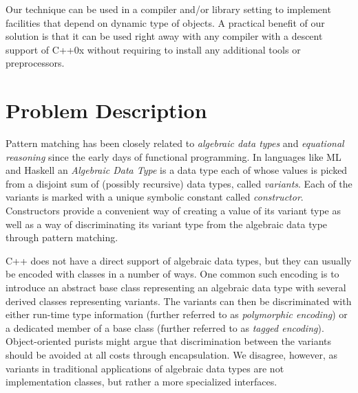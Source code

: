\documentclass[preprint]{sigplanconf}
\begin{document}
\noindent
Our technique can be used in a compiler and/or library setting to implement 
facilities that depend on dynamic type of objects. A practical benefit of our 
solution is that it can be used right away with any compiler with a descent 
support of C++0x without requiring to install any additional tools or 
preprocessors.

\section{Problem Description} %
\label{sec:probl}

Pattern matching has been closely related to \emph{algebraic data types} and 
\emph{equational reasoning} since the early days of functional programming.
In languages like ML and Haskell an \emph{Algebraic Data Type} is a data type 
each of whose values is picked from a disjoint sum of (possibly recursive) data 
types, called \emph{variants}. Each of the variants is marked with a unique 
symbolic constant called \emph{constructor}. Constructors provide a convenient 
way of creating a value of its variant type as well as a way of discriminating 
its variant type from the algebraic data type through pattern matching.

C++ does not have a direct support of algebraic data types, but they can usually 
be encoded with classes in a number of ways. One common such encoding is to 
introduce an abstract base class representing an algebraic data type with 
several derived classes representing variants. The variants can then be 
discriminated with either run-time type information (further referred to as 
\emph{polymorphic encoding}) or a dedicated member of a base class (further 
referred to as \emph{tagged encoding}). Object-oriented purists might argue that 
discrimination between the variants should be avoided at all costs through 
encapsulation. We disagree, however, as variants in traditional applications of 
algebraic data types are not implementation classes, but rather a more 
specialized interfaces.
\end{document}
